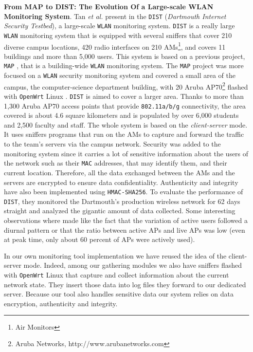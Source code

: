 \textbf{From MAP to DIST: The Evolution Of a Large-scale WLAN Monitoring System}. Tan \textit{et al.} present in \citep{article3} the \texttt{DIST} (\textit{Dartmouth Internet Security Testbed}), a large-scale \texttt{WLAN} monitoring system. \texttt{DIST} is a really large \texttt{WLAN} monitoring system that is equipped with several sniffers that cover 210 diverse campus locations, 420 radio interfaces on 210 AMs\footnote{Air Monitors}, and covers 11 buildings and more than 5,000 users. This system is based on a previous project, \texttt{MAP} \cite{MAP}, that is a building-wide \texttt{WLAN} monitoring system. The \texttt{MAP} project was more focused on a \texttt{WLAN} security monitoring system and covered a small area of the campus, the computer-science department building, with 20 Aruba AP70\footnote{Aruba Networks, http://www.arubanetworks.com} flashed with \texttt{OpenWrt} Linux \cite{openwrt}. \texttt{DIST} is aimed to cover a larger area. Thanks to more than 1,300 Aruba AP70 access points that provide \texttt{802.11a/b/g} connectivity, the area covered is about 4.6 square kilometers and is populated by over 6,000 students and 2,500 faculty and staff. The whole system is based on the \textit{client-server} mode. It uses sniffers programs that run on the AMs to capture and forward the traffic to the team's servers via the campus network. Security was added to the monitoring system since it carries a lot of sensitive information about the users of the network such as their \texttt{MAC} addresses, that may identify them, and their current location. Therefore, all the data exchanged between the AMs and the servers are encrypted to ensure data confidentiality. Authenticity and integrity have also been implemented using \texttt{HMAC-SHA256}. To evaluate the performance of \texttt{DIST}, they monitored the Dartmouth's production wireless network for 62 days straight and analyzed the gigantic amount of data collected. Some interesting observations where made like the fact that the variation of active users followed a diurnal pattern or that the ratio between active APs and live APs was low (even at peak time, only about 60 percent of APs were actively used).

In our own monitoring tool implementation we have reused the idea of the client-server mode. Indeed, among our gathering modules we also have sniffers flashed with \texttt{OpenWrt} Linux that capture and collect information about the current network state. They insert those data into log files they forward to our dedicated server. Because our tool also handles sensitive data our system relies on data encryption, authenticity and integrity.


